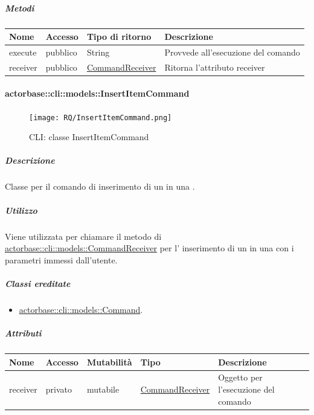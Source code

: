 \documentclass{scalatekids-article}
\begin{document}
\subparagraph{Metodi}

\begin{tabular}{| p{3cm} | p{1.5cm} | p{3.5cm} | p{9cm} |}
  \hline
  Nome & Accesso & Tipo di ritorno & Descrizione\\
  \hline
  execute & pubblico & String & Provvede all'esecuzione del comando\\
  \hline
  receiver & pubblico & \hyperref[sec:actorbase::cli::models::CommandReceiver]{CommandReceiver} & Ritorna l'attributo receiver\\
  \hline
\end{tabular}

\paragraph{actorbase::cli::models::InsertItemCommand}
\label{sec:actorbase::cli::models::InsertItemCommand}

\begin{figure}[H]
  \begin{center}
    \texttt{[image: RQ/InsertItemCommand.png]}
    \caption{CLI: classe InsertItemCommand}
  \end{center}
\end{figure}

\subparagraph{Descrizione}

Classe per il comando di inserimento di un  in una
.

\subparagraph{Utilizzo}

Viene utilizzata per chiamare il metodo di \hyperref[sec:actorbase::cli::models::CommandReceiver]{actorbase::cli::models::CommandReceiver} per l' inserimento di un  in una  con i parametri immessi dall'utente.

\subparagraph{Classi ereditate}

\begin{itemize}
\item \hyperref[sec:actorbase::cli::models::Command]{actorbase::cli::models::Command}.
\end{itemize}

\subparagraph{Attributi}

\begin{tabular}{| p{1cm} | p{1.5cm} | p{2cm} | p{4cm} | p{8.5cm} |}
  \hline
  Nome & Accesso & Mutabilità & Tipo & Descrizione\\
  \hline
  receiver & privato & mutabile & \hyperref[sec:actorbase::cli::models::CommandReceiver]{CommandReceiver} & Oggetto per l'esecuzione del comando\\
  \hline
\end{tabular}
\end{document}

